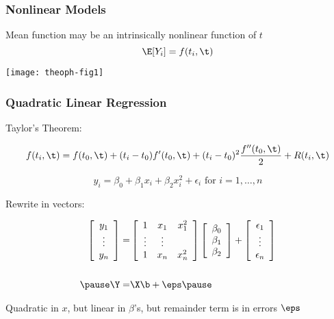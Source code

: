 \documentclass[handout]{beamer}
\begin{document}
\begin{frame}
  \frametitle{Nonlinear Models}
Mean function may be an intrinsically nonlinear function of $t$
  $$\E[Y_i] = f(t_i, \t)$$   

\centerline{ \texttt{[image: theoph-fig1]} }

\end{frame}
\begin{frame} \frametitle{Quadratic Linear Regression}
Taylor's Theorem:

$$f(t_i, \t) = f(t_0, \t) + (t_i - t_0) f'(t_0, \t) + (t_i - t_0)^2
\frac{f''(t_0, \t)}{2}  + R(t_i, \t)$$
\pause


$$y_i = \beta_0 + \beta_1 x_i + \beta_2 x_i^2 + \epsilon_i \text{  for  } i = 1, \ldots, n$$

\pause Rewrite in vectors:

\begin{eqnarray*}
\left[
\begin{array}{c}  y_1 \\ \vdots \\  y_n \end{array} 
  \right]   =  & 
 \left[ \begin{array}{ccc}  1 &  x_1 & x_1^2 \\ \vdots & \vdots \\ 1 &
     x_n &  x_n^2\end{array}  \right]   
 \left[ \begin{array}{c}  \beta_0  \\  \beta_1 \\ \beta_2 \end{array}
 \right] + 
\left[ \begin{array}{c}  \epsilon_1 \\ \vdots \\ \epsilon_n  \end{array}
\right] \\
 & \\ \pause
\Y = & \X \b + \eps \pause
\end{eqnarray*}

Quadratic in $x$, but linear in $\beta$'s, but remainder term is in
errors $\eps$
\end{frame}
\end{document}
